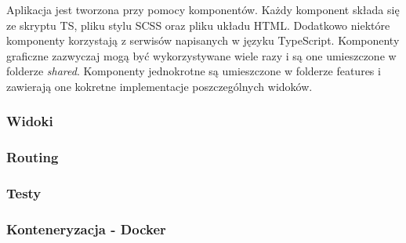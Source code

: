 \documentclass[../../main.tex]{subfiles}
\begin{document}
        Aplikacja jest tworzona przy pomocy komponentów. Każdy komponent składa się ze skryptu TS, pliku stylu SCSS oraz pliku układu HTML. Dodatkowo niektóre komponenty korzystają z serwisów napisanych w języku TypeScript. Komponenty graficzne zazwyczaj mogą być wykorzystywane wiele razy i są one umieszczone w folderze \emph{shared}. Komponenty jednokrotne są umieszczone w folderze features i zawierają one kokretne implementacje poszczególnych widoków.
    \subsubsection{Widoki}
    \subsubsection{Routing}
    \subsubsection{Testy}
    \subsubsection{Konteneryzacja - Docker}
\end{document}
